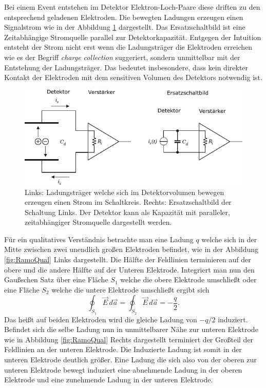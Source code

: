 Bei einem Event entstehen im Detektor Elektron-Loch-Paare diese driften zu den entsprechend geladenen Elektroden.
Die bewegten Ladungen erzeugen einen Signalstrom wie in der Abbildung \ref{fig:RamoEq} dargestellt.
Das Ersatzschaltbild ist eine Zeitabhängige Stromquelle parallel zur Detektorkapazität.
Entgegen der Intuition entsteht der Strom nicht erst wenn die Ladungsträger die Elektroden erreichen wie es der Begriff \textit{charge collection} suggeriert, sondern unmittelbar mit der Entstehung der Ladungsträger.
Das bedeutet insbesondere, dass kein direkter Kontakt der Elektroden mit dem sensitiven Volumen des Detektors notwendig ist.

\begin{figure}[!b]
\begin{center}
\includegraphics[scale=1.25]{./fig/RamoEquivalent.pdf}
\end{center}
\vspace{-0.5cm}
\caption{Links: Ladungsträger welche sich im Detektorvolumen bewegen erzeugen einen Strom im Schaltkreis. Rechts: Ersatzschaltbild der Schaltung Links. Der Detektor kann als Kapazität mit paralleler, zeitabhängiger Stromquelle dargestellt werden.\cite{Editors}}
\label{fig:RamoEq}
\end{figure}

Für ein qualitatives Verständnis betrachte man eine Ladung $q$ welche sich in der Mitte zwischen zwei unendlich großen Elektroden befindet, wie in der Abbildung \ref{fig:RamoQual} Links dargestellt.
Die Hälfte der Feldlinien terminieren auf der obere und die andere Hälfte auf der Unteren Elektrode.
Integriert man nun den Gaußschen Satz über eine Fläche $S_1$ welche die obere Elektrode umschließt oder eine Fläche $S_2$ welche die untere Elektrode umschließt ergibt sich
\begin{equation}
\oint_{S_1} \vec{E} \,d\vec{a} = \oint_{S_2} \vec{E} \,d\vec{a} = -\frac{q}{2}.
\end{equation}
Das heißt auf beiden Elektroden wird die gleiche Ladung von $-q/2$ induziert.
Befindet sich die selbe Ladung nun in unmittelbarer Nähe zur unteren Elektrode wie in Abbildung \ref{fig:RamoQual} Rechts dargestellt terminiert der Großteil der Feldlinien an der unteren Elektrode.
Die Induzierte Ladung ist somit in der unteren Elektrode deutlich größer.
Eine Ladung die sich also von der oberen zur unteren Elektrode bewegt induziert eine abnehmende Ladung in der oberen Elektrode und eine zunehmende Ladung in der unteren Elektrode.\cite{Editors}

